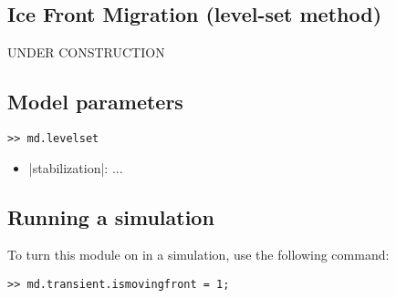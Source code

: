 
\subsection{Ice Front Migration (level-set method)} \label{sec:using-issm-capabilities-levelset}
UNDER CONSTRUCTION

\subsection{Model parameters}

\begin{lstlisting}
>> md.levelset
\end{lstlisting}

\begin{itemize}
	\item \lstinlinebg|stabilization|: ...
\end{itemize}

\subsection{Running a simulation}
To turn this module on in a simulation, use the following command:
\begin{lstlisting}
>> md.transient.ismovingfront = 1;
\end{lstlisting}

\clearpage %
